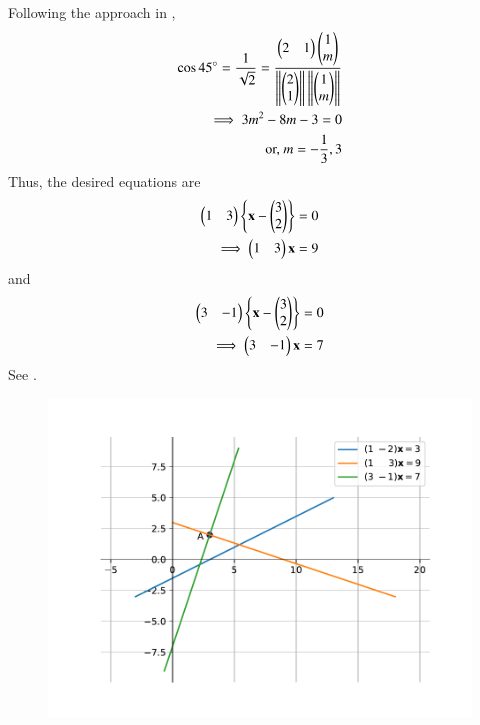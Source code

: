 Following the approach in ,
\begin{align}
\cos45\degree =
\frac{1}{\sqrt{2}} = \frac{\begin{pmatrix}2 & 1\end{pmatrix} \begin{pmatrix}1\\m\end{pmatrix}}{\left\lVert\begin{pmatrix}2\\1\end{pmatrix}\right\rVert\left\lVert\begin{pmatrix}1\\m\end{pmatrix}\right\rVert}
\\
\implies 
 3m^2 - 8m -3 = 0
 \\
\text{or, }
m= - \frac{1}{3}, 3
\end{align} 
Thus, the desired equations are 
\begin{align}
	\begin{pmatrix}1&3\end{pmatrix}\left\{\mathbf{x}-\begin{pmatrix}3\\2\end{pmatrix}\right\}&=0\\
 \implies 	\begin{pmatrix}1 & 3\end{pmatrix}\mathbf{x} &= 9
\end{align}
and 
\begin{align}
	\begin{pmatrix}3&-1\end{pmatrix}\left\{\mathbf{x}-\begin{pmatrix}3\\2\end{pmatrix}\right\}&=0\\
		\implies 	\begin{pmatrix}3 & -1\end{pmatrix}\mathbf{x} &= 7
\end{align}
See
.
\begin{figure}[H]
\centering
\includegraphics[width=0.75\columnwidth]{chapters/11/10/4/11/figs/fig.pdf}
\caption{}
\label{fig:chapters/11/10/4/11/figs/strline.jpg}
\end{figure}
